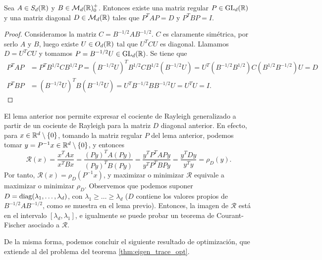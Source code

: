 \begin{lem} \label{lem:diag_simult}
    Sea $A \in S_d(\mathbb{R})$ y $B \in \mathcal{M}_d(\mathbb{R})^+_0$. Entonces existe una matriz regular $P \in \operatorname{GL}_d(\mathbb{R})$ y una matriz diagonal $D \in \mathcal{M}_d(\mathbb{R})$ tales que $P^TAP = D$ y $P^TBP = I$.
\end{lem}

\begin{proof}
    Consideramos la matriz $C = B^{-1/2}AB^{-1/2}$. $C$ es claramente simétrica, por serlo $A$ y $B$, luego existe $U \in O_d(\mathbb{R})$ tal que $U^TCU$ es diagonal. Llamamos $D = U^TCU$ y tomamos $P = B^{-1/2}U \in \operatorname{GL}_d(\mathbb{R})$. Se tiene que
    \begin{align*}
        P^TAP &= P^TB^{1/2}CB^{1/2}P = (B^{-1/2}U)^TB^{1/2}CB^{1/2}(B^{-1/2}U) = U^T(B^{-1/2}B^{1/2})C(B^{1/2}B^{-1/2})U = D \\
        P^TBP &= (B^{-1/2}U)^TB(B^{-1/2}U) = U^TB^{-1/2}BB^{-1/2}U = U^TU = I.
    \end{align*}
\end{proof}

El lema anterior nos permite expresar el cociente de Rayleigh generalizado a partir de un cociente de Rayleigh para la matriz $D$ diagonal anterior. En efecto, para $x \in \mathbb{R}^d \setminus \{0\}$, tomando la matriz regular $P$ del lema anterior, podemos tomar $y = P^{-1}x \in \mathbb{R}^d\setminus\{0\}$, y entonces
\[ \mathcal{R}(x) = \frac{x^TAx}{x^TBx} = \frac{(Py)^TA(Py)}{(Py)^TB(Py)} = \frac{y^TP^TAPy}{y^TP^TBPy} = \frac{y^TDy}{y^Ty} = \rho_D(y). \]
Por tanto, $\mathcal{R}(x) = \rho_D(P^{-1}x)$, y maximizar o minimizar $\mathcal{R}$ equivale a maximizar o minimizar $\rho_D$. Observemos que podemos suponer $D = \operatorname{diag}(\lambda_1,\dots,\lambda_d)$, con $\lambda_1 \ge \dots \ge \lambda_d$ ($D$ contiene los valores propios de $B^{-1/2}AB^{-1/2}$, como se muestra en el lema previo). Entonces, la imagen de $\mathcal{R}$ está en el intervalo $[\lambda_d,\lambda_1]$, e igualmente se puede probar un teorema de Courant-Fischer asociado a $\mathcal{R}$.

De la misma forma, podemos concluir el siguiente resultado de optimización, que extiende al del problema del teorema \ref{thm:eigen_trace_opt}.

\begin{comment}
Notemos además que para la base canónica $\{e_1,\dots,e_d\}$ de $\R^d$, se tiene que $\rho_D(e_i) = \lambda_i$, y en consecuencia $\mathcal{R}(Pe_i) = \lambda_i$. Por otra parte, de $P^TAP = D$ y $P^TBP = I$, se deduce que
\[ D = P^TAP = (P^TBP)^{-1}(P^TAP) = P^{-1}B^{-1}P^{-T}P^TAP = P^{-1}B^{-1}AP, \]
luego $D$ es una matriz diagonal semejante a $B^{-1}A$. Por tanto, si $v_1, \dots, v_d$ son vectores propios de $B^{-1}A$ asociados a $\lambda_1,\dots,\lambda_d$, se tiene que $Av_i = \lambda_iBv_i$, y entonces
\[ \mathcal{R}(v_i) = \frac{v_i^TAv_i}{v_i^TBv_i} = \lambda_i\frac{v_i^TBv_i}{v_i^TBv_i} = \lambda_i, \]
y por tanto estos vectores propios maximizan el problema del teorema \ref{thm:eigen_trace_opt} asociado a la matriz $D$. Podemos concluir el siguiente resultado sobre optimización, que extiende al del problema del teorema \ref{thm:eigen_trace_opt}.
\end{comment}

